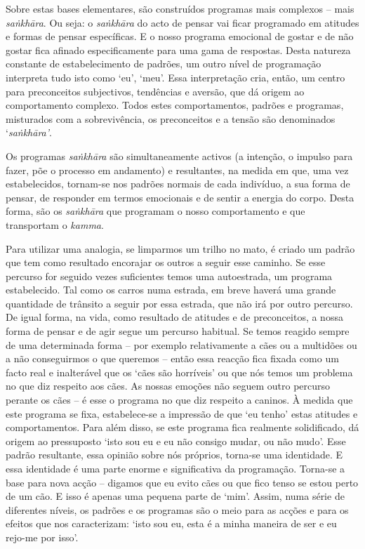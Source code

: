 Sobre estas bases elementares, são construídos programas mais complexos -- mais \emph{saṅkhāra}. Ou seja: o \emph{saṅkhāra} do acto de pensar vai ficar programado em atitudes e formas de pensar específicas. E o nosso programa emocional de gostar e de não gostar fica afinado especificamente para uma gama de respostas. Desta natureza constante de estabelecimento de padrões, um outro nível de programação interpreta tudo isto como `eu', `meu'. Essa interpretação cria, então, um centro para preconceitos subjectivos, tendências e aversão, que dá origem ao comportamento complexo. Todos estes comportamentos, padrões e programas, misturados com a sobrevivência, os preconceitos e a tensão são denominados `\emph{saṅkhāra'}.

Os programas \emph{saṅkhāra} são simultaneamente activos (a intenção, o impulso para fazer, põe o processo em andamento) e resultantes, na medida em que, uma vez estabelecidos, tornam-se nos padrões normais de cada indivíduo, a sua forma de pensar, de responder em termos emocionais e de sentir a energia do corpo. Desta forma, são os \emph{saṅkhāra} que programam o nosso comportamento e que transportam o \emph{kamma}.

Para utilizar uma analogia, se limparmos um trilho no mato, é criado um padrão que tem como resultado encorajar os outros a seguir esse caminho. Se esse percurso for seguido vezes suficientes temos uma autoestrada, um programa estabelecido. Tal como os carros numa estrada, em breve haverá uma grande quantidade de trânsito a seguir por essa estrada, que não irá por outro percurso. De igual forma, na vida, como resultado de atitudes e de preconceitos, a nossa forma de pensar e de agir segue um percurso habitual. Se temos reagido sempre de uma determinada forma -- por exemplo relativamente a cães ou a multidões ou a não conseguirmos o que queremos -- então essa reacção fica fixada como um facto real e inalterável que os `cães são horríveis' ou que nós temos um problema no que diz respeito aos cães. As nossas emoções não seguem outro percurso perante os cães -- é esse o programa no que diz respeito a caninos. À medida que este programa se fixa, estabelece-se a impressão de que `eu tenho' estas atitudes e comportamentos. Para além disso, se este programa fica realmente solidificado, dá origem ao pressuposto `isto sou eu e eu não consigo mudar, ou não mudo'. Esse padrão resultante, essa opinião sobre nós próprios, torna-se uma identidade. E essa identidade é uma parte enorme e significativa da programação. Torna-se a base para nova acção -- digamos que eu evito cães ou que fico tenso se estou perto de um cão. E isso é apenas uma pequena parte de `mim'. Assim, numa série de diferentes níveis, os padrões e os programas são o meio para as acções e para os efeitos que nos caracterizam: `isto sou eu, esta é a minha maneira de ser e eu rejo-me por isso'.

